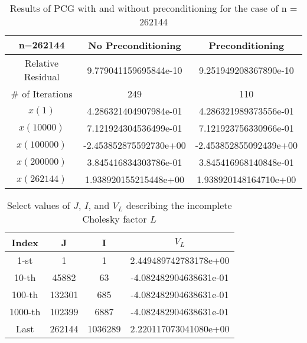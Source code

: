 \documentclass[12pt]{article}
\begin{document}
\begin{itemize}
\begin{table}[H]
\centering
\renewcommand{\arraystretch}{1.3}
\begin{small}
\begin{tabular}{| c || c | c |}
\hline
$\textbf{n=262144}$ &  No Preconditioning & Preconditioning\\
\hline 
\hline
Relative Residual &  9.779041159695844e-10 & 9.251949208367890e-10  \\
\hline
$\#$ of Iterations & 249  &  110 \\
\hline
$x(1)$ & 4.286321404907984e-01  &  4.286321989373556e-01 \\
$x(10000)$ &  7.121924304536499e-01 & 7.121923756330966e-01  \\
$x(100000)$ &  -2.453852875592730e+00 &  -2.453852855092439e+00 \\
$x(200000)$ & 3.845416834303786e-01  & 3.845416968140848e-01  \\
$x(262144)$ & 1.938920155215448e+00  &  1.938920148164710e+00 \\
\hline
\end{tabular}
\end{small}
\caption{Results of PCG with and without preconditioning for the case of n = 262144}
\end{table} 

\begin{table}[H]
\centering
\renewcommand{\arraystretch}{1.3}
\begin{small}
\begin{tabular}{| c | c | c | c |}
\hline
Index &  J & I & $V_L$\\
\hline
\hline 
1-st & 1  &  1 &  2.449489742783178e+00 \\
10-th & 45882  & 63  &  -4.082482904638631e-01 \\
100-th &  132301 & 685  &  -4.082482904638631e-01 \\
1000-th & 102399  & 6887  & -4.082482904638631e-01  \\
Last & 262144  & 1036289  &  2.220117073041080e+00 \\
\hline
\end{tabular}
\end{small}
\caption{Select values of $J$, $I$, and $V_L$ describing the incomplete Cholesky factor $L$}
\end{table}





\end{itemize}
\end{document}
